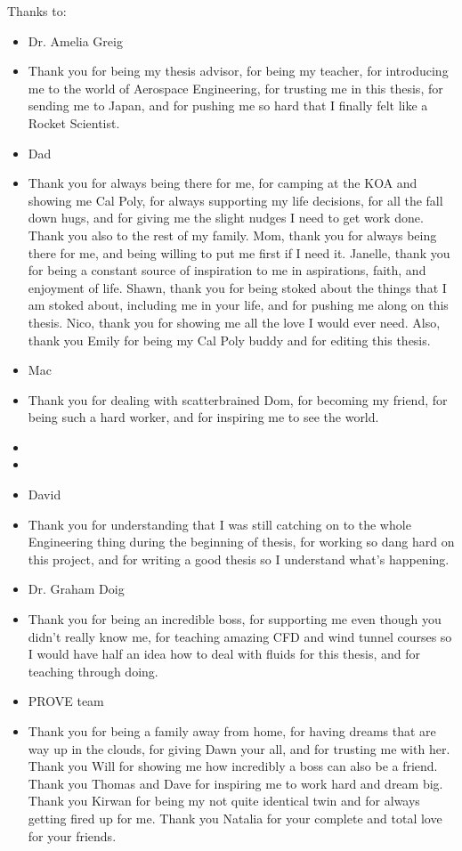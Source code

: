 \noindent
Thanks to:
\begin{itemize}
    \item Dr. Amelia Greig  
    \item[] Thank you for being my thesis advisor, for being my teacher, for introducing me to the world of Aerospace Engineering, for trusting me in this thesis, for sending me to Japan, and for pushing me so hard that I finally felt like a Rocket Scientist.
    \item Dad   
    \item[] Thank you for always being there for me, for camping at the KOA and showing me Cal Poly, for always supporting my life decisions, for all the fall down hugs, and for giving me the slight nudges I need to get work done. Thank you also to the rest of my family. Mom, thank you for always being there for me, and being willing to put me first if I need it. Janelle, thank you for being a constant source of inspiration to me in aspirations, faith, and enjoyment of life. Shawn, thank you for being stoked about the things that I am stoked about, including me in your life, and for pushing me along on this thesis. Nico, thank you for showing me all the love I would ever need. Also, thank you Emily for being my Cal Poly buddy and for editing this thesis.
    \item Mac   
    \item[] Thank you for dealing with scatterbrained Dom, for becoming my friend, for being such a hard worker, and for inspiring me to see the world.
    \item[] 
    \item[] 
    \item David   
    \item[] Thank you for understanding that I was still catching on to the whole Engineering thing during the beginning of thesis, for working so dang hard on this project, and for writing a good thesis so I understand what's happening. 
    \item  Dr. Graham Doig   
    \item[] Thank you for being an incredible boss, for supporting me even though you didn't really know me, for teaching amazing CFD and wind tunnel courses so I would have half an idea how to deal with fluids for this thesis, and for teaching through doing.
    \item PROVE team   
    \item[] Thank you for being a family away from home, for having dreams that are way up in the clouds, for giving Dawn your all, and for trusting me with her. Thank you Will for showing me how incredibly a boss can also be a friend. Thank you Thomas and Dave for inspiring me to work hard and dream big. Thank you Kirwan for being my not quite identical twin and for always getting fired up for me. Thank you Natalia for your complete and total love for your friends.

\end{itemize}
